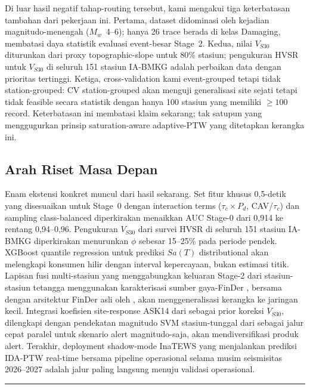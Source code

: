 \documentclass[10pt]{article}
\renewcommand{\cite}[1]{\citep{#1}}
\begin{document}
Di luar hasil negatif tahap-routing tersebut, kami mengakui tiga keterbatasan tambahan dari pekerjaan ini. Pertama, dataset didominasi oleh kejadian magnitudo-menengah ($M_w$~4--6); hanya 26 trace berada di kelas Damaging, membatasi daya statistik evaluasi event-besar Stage~2. Kedua, nilai $V_{S30}$ diturunkan dari proxy topographic-slope untuk 80\% stasiun; pengukuran HVSR untuk $V_{S30}$ di seluruh 151 stasiun IA-BMKG adalah perbaikan data dengan prioritas tertinggi. Ketiga, cross-validation kami event-grouped tetapi tidak station-grouped: CV station-grouped akan menguji generalisasi site sejati tetapi tidak feasible secara statistik dengan hanya 100 stasiun yang memiliki $\geq 100$ record. Keterbatasan ini membatasi klaim sekarang; tak satupun yang menggugurkan prinsip saturation-aware adaptive-PTW yang ditetapkan kerangka ini.

\subsection{Arah Riset Masa Depan}

Enam ekstensi konkret muncul dari hasil sekarang. Set fitur khusus 0,5-detik yang disesuaikan untuk Stage~0 dengan interaction terms ($\tau_c \times P_d$, CAV/$\tau_c$) dan sampling class-balanced diperkirakan menaikkan AUC Stage-0 dari 0,914 ke rentang 0,94--0,96. Pengukuran $V_{S30}$ dari survei HVSR \cite{ref87} di seluruh 151 stasiun IA-BMKG diperkirakan menurunkan $\phi$ sebesar 15--25\% pada periode pendek. XGBoost quantile regression untuk prediksi $Sa(T)$ distributional \cite{ref36} akan melengkapi konsumen hilir dengan interval kepercayaan, bukan estimasi titik. Lapisan fusi multi-stasiun yang menggabungkan keluaran Stage-2 dari stasiun-stasiun tetangga menggunakan karakterisasi sumber gaya-FinDer \cite{ref88}, bersama dengan arsitektur FinDer asli oleh \citet{ref72}, akan menggeneralisasi kerangka ke jaringan kecil. Integrasi koefisien site-response ASK14 dari \citet{ref70} sebagai prior koreksi $V_{S30}$, dilengkapi dengan pendekatan magnitudo SVM stasiun-tunggal dari \citet{ref73} sebagai jalur cepat paralel untuk skenario alert magnitudo-saja, akan mendiversifikasi produk alert. Terakhir, deployment shadow-mode InaTEWS yang menjalankan prediksi IDA-PTW real-time bersama pipeline operasional selama musim seismisitas 2026--2027 adalah jalur paling langsung menuju validasi operasional.

\begin{center}\rule{0.5\linewidth}{0.5pt}\end{center}
\end{document}
